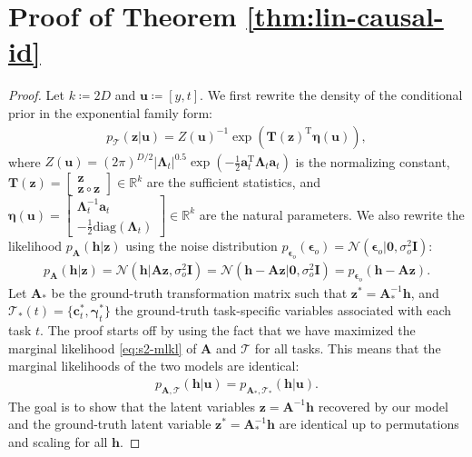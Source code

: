 \documentclass[nohyperref]{article}
\theoremstyle{plain}
\theoremstyle{definition}
\theoremstyle{remark}
\begin{document}
\section{Proof of Theorem \ref{thm:lin-causal-id}}\label{appendix:proof-causal-id}
\begin{proof}
    Let $k\coloneqq2D$ and $\mathbf{u}\coloneqq[y,t]$. We first rewrite the density of the conditional prior in the exponential family form:
    \begin{align}
        p_{\mathcal{T}}(\mathbf{z}|\mathbf{u}) = Z(\mathbf{u})^{-1}\exp\left(\mathbf{T}(\mathbf{z})^{\text{T}}\boldsymbol{\eta}(\mathbf{u})\right),
    \end{align}
    where $Z(\mathbf{u})=(2\pi)^{D/2}|\boldsymbol{\Lambda}_t|^{0.5}\exp\left(-\frac{1}{2}\mathbf{a}_t^{\text{T}}\boldsymbol{\Lambda}_t\mathbf{a}_t\right)$ is the normalizing constant, $\mathbf{T}(\mathbf{z})=\left[\begin{smallmatrix}\mathbf{z} \\ \mathbf{z}\circ\mathbf{z}\end{smallmatrix}\right]\in\mathbb{R}^{k}$ are the sufficient statistics, and $\boldsymbol{\eta}(\mathbf{u})=\left[\begin{smallmatrix}\boldsymbol{\Lambda}_t^{-1}\mathbf{a}_t \\ -\frac{1}{2}\text{diag}(\boldsymbol{\Lambda}_t)\end{smallmatrix}\right]\in\mathbb{R}^{k}$ are the natural parameters. We also rewrite the likelihood $p_{\mathbf{A}}(\mathbf{h}|\mathbf{z})$ using the noise distribution $p_{\boldsymbol{\epsilon}_o}(\boldsymbol{\epsilon}_o)=\mathcal{N}(\boldsymbol{\epsilon}_o|\mathbf{0},\sigma_o^2\mathbf{I})$:
    \begin{align}
        p_{\mathbf{A}}(\mathbf{h}|\mathbf{z}) =\mathcal{N}(\mathbf{h}|\mathbf{A}\mathbf{z},\sigma_{o}^{2}\mathbf{I})=\mathcal{N}(\mathbf{h}-\mathbf{A}\mathbf{z}|\mathbf{0},\sigma_o^2\mathbf{I})=p_{\boldsymbol{\epsilon}_o}(\mathbf{h}-\mathbf{A}\mathbf{z}).
    \end{align}
    Let $\mathbf{A}_{*}$ be the ground-truth transformation matrix such that $\mathbf{z}^*=\mathbf{A}_{*}^{-1}\mathbf{h}$, and $\mathcal{T}_{*}(t)=\{\mathbf{c}_t^*,\boldsymbol{\gamma}_t^*\}$ the ground-truth task-specific variables associated with each task $t$. The proof starts off by using the fact that we have maximized the marginal likelihood \eqref{eq:s2-mlkl} of $\mathbf{A}$ and $\mathcal{T}$ for all tasks. This means that the marginal likelihoods of the two models are identical:
    \begin{align}\label{eq:equal-mlkl}
        p_{\mathbf{A},\mathcal{T}}(\mathbf{h}|\mathbf{u})=p_{\mathbf{A}_{*},\mathcal{T}_{*}}(\mathbf{h}|\mathbf{u}).
    \end{align}
    The goal is to show that the latent variables $\mathbf{z}=\mathbf{A}^{-1}\mathbf{h}$ recovered by our model and the ground-truth latent variable $\mathbf{z}^*=\mathbf{A}_{*}^{-1}\mathbf{h}$ are identical up to permutations and scaling for all $\mathbf{h}$. 
    

\end{proof}
\end{document}

